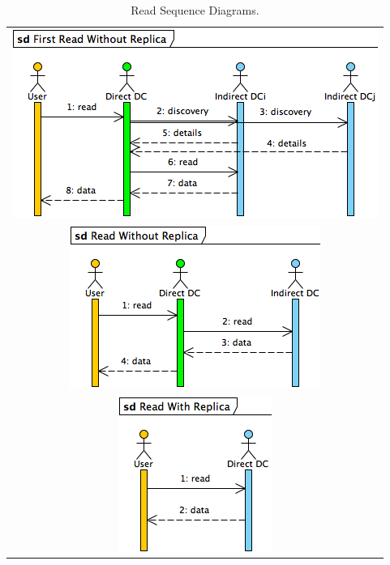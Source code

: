 \documentclass[english]{article}
\begin{document}
\begin{table}[htpb!]
	\begin{center}
		\begin{tabular}{c}
			\includegraphics[width=.96\textwidth]{figures/firstReadWithoutReplica.png} \\
			\includegraphics[width=.7\textwidth]{figures/readWithoutReplica.png} \\
			\includegraphics[width=.45\textwidth]{figures/readWithReplica.png}
		\end{tabular}
		
		\caption{Read Sequence Diagrams.}
		\label{tb:read_sequence_diagrams}
	\end{center}
\end{table}
\end{document}
